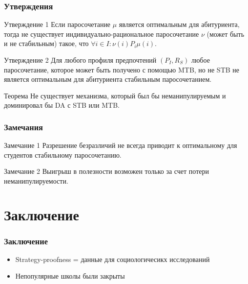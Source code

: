 \documentclass[10pt,pdf,hyperref={unicode}]{beamer}
\begin{document}
\begin{frame}
    \frametitle{Утверждения}
    \begin{block}{Утверждение 1}
        Если паросочетание $\mu$ является оптимальным для абитуриента, тогда не существует индивидуально-рациональное паросочетание $\nu$ (может быть и не стабильным) такое, что $\forall i \in I: \nu(i) P_i \mu(i)$.
    \end{block}

    \begin{block}{Утверждение 2}
        Для любого профиля предпочтений $(P_I, R_S)$ любое паросочетание, которое может быть получено с помощью MTB, но не STB не является оптимальным для абитуриента стабильным паросочетанием.
    \end{block}

    \begin{block}{Теорема}
        Не существует механизма, который был бы неманипулируемым и доминировал бы DA с STB или MTB.
    \end{block}
\end{frame}

\begin{frame}
    \frametitle{Замечания}
    \begin{block}{Замечание 1}
        Разрешение безразличий не всегда приводит к оптимальному для студентов стабильному паросочетанию.
    \end{block}

    \begin{block}{Замечание 2}
        Выигрыш в полезности возможен только за счет потери неманипулируемости.
    \end{block}
\end{frame}

\section{Заключение}

\begin{frame}
    \frametitle{Заключение}
    \begin{block}{ }
        \begin{itemize}
            \item Strategy-proofness = данные для социологичесикх исследований
            \item Непопулярные школы были закрыты
        \end{itemize}
    \end{block}
\end{frame}
\end{document}
